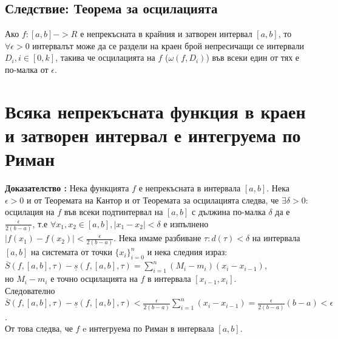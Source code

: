 \documentclass[fleqn,12pt]{article}
\begin{document}
\begin{flushleft}
\subsection{Следствие: Теорема за осцилацията}
Ако $f:[a,b]->R$ е непрекъсната в крайния и затворен интервал $[a,b]$, то $\forall \epsilon>0$ интервалът може да се раздели на краен брой непресичащи се интервали $D_i, i\in[0,k]$,
такива че осцилацията на $f$ ($\omega(f,D_i)$) във всеки един от тях е по-малка от $\epsilon$. 


\section{Всяка непрекъсната функция в краен и затворен интервал е интегруема по Риман}
\textbf{Доказателство :} Нека функцията $f$ е непрекъсната в интервала $[a,b]$. Нека $\epsilon > 0$ и от Теоремата на Кантор и от Теоремата за осцилацията следва, че $\exists \delta>0 :$ осцилация на  $f$ във всеки подтинтервал
на $[a,b]$ с дължина по-малка $\delta$ да е $\frac{\epsilon}{2(b-a)}$, т.е $\forall x_1,x_2 \in [a,b] , |x_1 - x_2| < \delta$ е изпълнено $|f(x_1)-f(x_2)| < \frac{\epsilon}{2(b-a)}$.
Нека имаме разбиване $\tau: d(\tau)<\delta$ на интервала $[a,b]$ на системата от точки $\{x_i\}_{i=0}^{n}$ и нека следния израз:
$\overline{S}(f,[a,b],\tau) - \underline{s}(f,[a,b],\tau) = \sum_{i=1}^{n} (M_i - m_i)(x_i - x_{i-1})$,\\
но $M_i - m_i$ е точно осцилацията на $f$ в интервала $[x_{i-1},x_i]$.\\
Следователно $\overline{S}(f,[a,b],\tau) - \underline{s}(f,[a,b],\tau) < \frac{\epsilon}{2(b-a)}\sum_{i=1}^{n} (x_i - x_{i-1}) = \frac{\epsilon}{2(b-a)}(b-a)< \epsilon$.\\
От това следва, че $f$ e интегруема по Риман в интервала $[a,b]$.


\end{flushleft}
\end{document}
